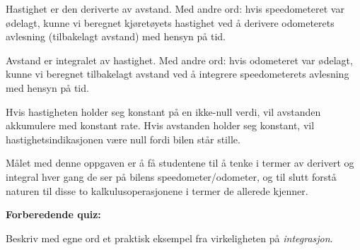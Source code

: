 Hastighet er den deriverte av avstand. Med andre ord: hvis speedometeret var ødelagt, kunne vi beregnet kjøretøyets hastighet ved å derivere odometerets avlesning (tilbakelagt avstand) med hensyn på tid.

\vskip 10pt

Avstand er integralet av hastighet. Med andre ord: hvis odometeret var ødelagt, kunne vi beregnet tilbakelagt avstand ved å integrere speedometerets avlesning med hensyn på tid.

\vskip 10pt

Hvis hastigheten holder seg konstant på en ikke-null verdi, vil avstanden akkumulere med konstant rate. Hvis avstanden holder seg konstant, vil hastighetsindikasjonen være null fordi bilen står stille.







Målet med denne oppgaven er å få studentene til å tenke i termer av derivert og integral hver gang de ser på bilens speedometer/odometer, og til slutt forstå naturen til disse to kalkulusoperasjonene i termer de allerede kjenner.









\vfil \eject

\noindent
{\bf Forberedende quiz:}

Beskriv med egne ord et praktisk eksempel fra virkeligheten på {\it integrasjon}.



